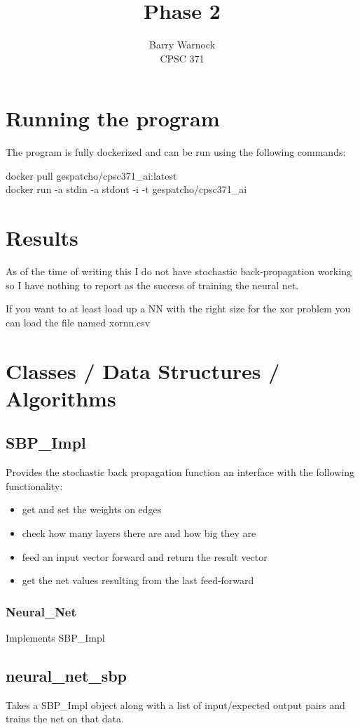 \documentclass{article}
\begin{document}
\title{Phase 2}
\author{Barry Warnock \\
  CPSC 371 \\}
\maketitle{}
\section{Running the program}
The program is fully dockerized and can be run using the following commands:
\begin{center}
  docker pull gespatcho/cpsc371\_ai:latest\\
  docker run -a stdin -a stdout -i -t gespatcho/cpsc371\_ai
  
\end{center}
\section{Results}
As of the time of writing this I do not have stochastic back-propagation working so I have nothing to report as the success of training the
neural net.

If you want to at least load up a NN with the right size for the xor problem you can load the file named xornn.csv

\section{Classes / Data Structures / Algorithms}
\subsection{SBP\_Impl}
Provides the stochastic back propagation function an interface with the following functionality:
\begin{itemize}
\item get and set the weights on edges
\item check how many layers there are and how big they are
\item feed an input vector forward and return the result vector
\item get the net values resulting from the last feed-forward
\end{itemize}
\subsubsection{Neural\_Net}
Implements SBP\_Impl

\subsection{neural\_net\_sbp}
Takes a SBP\_Impl object along with a list of input/expected output pairs and trains the net on that data.
\end{document}
